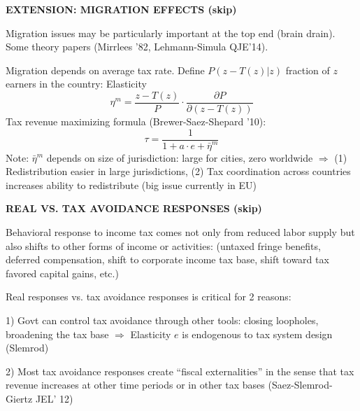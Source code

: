 \documentclass[landscape]{slides}
\begin{document}
\begin{slide}
\begin{center}
{\bf EXTENSION: MIGRATION EFFECTS (skip)}
\end{center}
Migration issues may be particularly important at the top end (brain
drain). Some theory papers (Mirrlees '82, Lehmann-Simula QJE'14). 

Migration depends on average tax rate. Define $P(z-T(z)|z)$
fraction of $z$ earners in the country: Elasticity
$$\eta^m=\frac{z-T(z)}{P} \cdot \frac{\partial P}{\partial (z-T(z))}
$$
Tax revenue maximizing formula (Brewer-Saez-Shepard '10):
$$\tau=\frac{1}{1+a \cdot e+ \bar{\eta}^m}$$
Note: $\bar{\eta}^m$ depends on size of jurisdiction: large for
cities, zero worldwide $\Rightarrow$ (1) Redistribution easier in
large jurisdictions, (2) Tax coordination across countries
increases ability to redistribute (big issue currently in EU)
\end{slide}

\begin{slide}
\begin{center}
{\bf REAL VS. TAX AVOIDANCE RESPONSES (skip)}
\end{center}
Behavioral response to income tax comes not only from reduced
labor supply but also shifts to other forms of income or
activities: (untaxed fringe benefits, deferred compensation, shift to corporate
income tax base, shift toward tax favored capital gains, etc.)

Real responses vs. tax avoidance responses is critical for 2 reasons:

1) Govt can control tax avoidance through other tools: closing loopholes,
broadening the tax base $\Rightarrow$ Elasticity $e$ is endogenous to
tax system design (Slemrod) 

2) Most tax avoidance responses create ``fiscal externalities'' in the
sense that tax revenue increases at other time periods or in other tax bases
(Saez-Slemrod-Giertz JEL' 12)
\end{slide}


%
%
%
%
\end{document}

